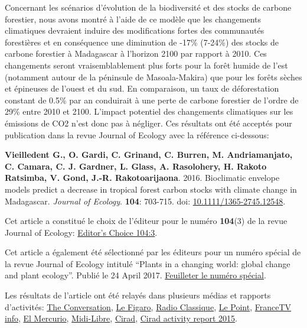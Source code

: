 \documentclass[]{article}
\begin{document}
Concernant les scénarios d'évolution de la biodiversité et des stocks de
carbone forestier, nous avons montré à l'aide de ce modèle que les
changements climatiques devraient induire des modifications fortes des
communautés forestières et en conséquence une diminution de -17\%
(7-24\%) des stocks de carbone forestier à Madagascar à l'horizon 2100
par rapport à 2010. Ces changements seront vraisemblablement plus forts
pour la forêt humide de l'est (notamment autour de la péninsule de
Masoala-Makira) que pour les forêts sèches et épineuses de l'ouest et du
sud. En comparaison, un taux de déforestation constant de 0.5\% par an
conduirait à une perte de carbone forestier de l'ordre de 29\% entre
2010 et 2100. L'impact potentiel des changements climatiques sur les
émissions de CO2 n'est donc pas à négliger. Ces résultats ont été
acceptés pour publication dans la revue Journal of Ecology avec la
référence ci-dessous:

\textbf{{Vieilledent G.}, O. Gardi, C. Grinand, C. Burren, M.
Andriamanjato, C. Camara, C. J. Gardner, L. Glass, A. Rasolohery, H.
Rakoto Ratsimba, V. Gond, J.-R. Rakotoarijaona}. 2016. Bioclimatic
envelope models predict a decrease in tropical forest carbon stocks with
climate change in Madagascar. \emph{Journal of Ecology}. \textbf{104}:
703-715. doi:
\href{http://dx.doi.org/10.1111/1365-2745.12548}{10.1111/1365-2745.12548}.

Cet article a constitué le choix de l'éditeur pour le numéro
\textbf{104}(3) de la revue Journal of Ecology:
\href{https://jecologyblog.wordpress.com/2016/05/06/editors-choice-1043/}{Editor's
Choice 104:3}.

Cet article a également été sélectionné par les éditeurs pour un numéro
spécial de la revue Journal of Ecology intitulé ``Plants in a changing
world: global change and plant ecology''. Publié le 24 April 2017.
\href{http://besjournals.onlinelibrary.wiley.com/hub/issue/10.1111/\%28ISSN\%291365-2745.globalchangevirtualissue}{Feuilleter
le numéro spécial}.

Les résultats de l'article ont été relayés dans plusieurs médias et
rapports d'activités: \href{https://t.co/pMXLUUrV0I}{The Conversation},
\href{/images/media/Figaro-16-02-2016.png}{Le Figaro},
\href{http://www.radioclassique.fr/player/progaction/initPlayer/podcast/3-minutes-pour-la-planete-2016-02-16-06-48-50.html}{Radio
Classique},
\href{http://www.lepoint.fr/environnement/le-rechauffement-climatique-risque-d-empecher-les-forets-tropicales-de-stocker-le-carbone-12-02-2016-2017587_1927.php\#xtor=RSS-221}{Le
Point},
\href{http://www.francetvinfo.fr/monde/environnement/le-rechauffement-climatique-risque-d-empecher-les-forets-tropicales-de-stocker-le-carbone_1312341.html\#xtor=AL-54-\%5Barticle\%5D}{FranceTV
info},
\href{http://www.emol.com/noticias/Tecnologia/2016/02/12/788109/Estudio-asegura-que-cambio-climatico-amenaza-la-absorcion-de-CO2-por-bosques-tropicales.html}{El
Mercurio}, \href{/images/media/MidiLibre-16-02-2016.png}{Midi-Libre},
\href{http://www.cirad.fr/en/news/all-news-items/press-releases/2016/climate-change-alters-the-co2-storage-capacity-of-tropical-forests}{Cirad},
\href{http://www.cirad.fr/content/download/11005/128917/version/2/file/RA2015_FR.pdf}{Cirad
activity report 2015}.
\end{document}
